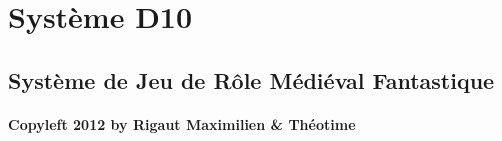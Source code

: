 \documentclass[12pt]{book}
\begin{document}
\chapter*{\Huge \center Système D10}
\thispagestyle{empty}
\section*{\center Système de Jeu de Rôle Médiéval Fantastique}



\begin{table}[b]
\begin{center}
    \subsubsection*{Copyleft 2012 by Rigaut Maximilien \& Théotime}
    \\[2.5ex]
    {\tiny\CcNote{\CcLongnameByNcSa}}
    \vspace*{-2.5ex}
\end{center}
\end{table} 

\frontmatter
 


\tableofcontents

\mainmatter





\end{document}

